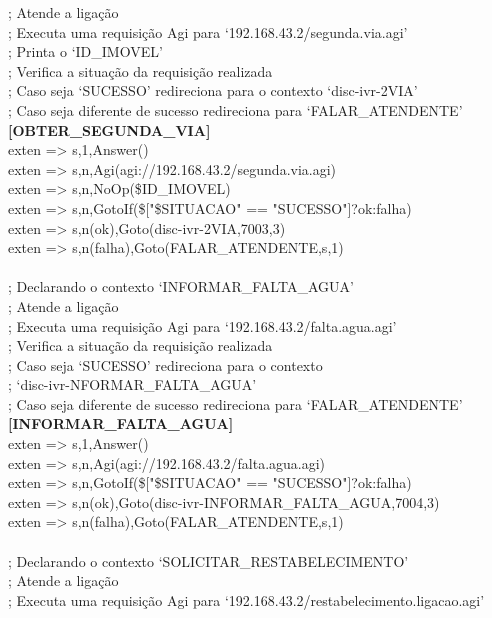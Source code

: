 \begin{apendicesenv}
; Atende a ligação \\
; Executa uma requisição Agi para ‘192.168.43.2/segunda.via.agi’ \\
; Printa o ‘ID\_IMOVEL’ \\
; Verifica a situação da requisição realizada \\
; Caso seja ‘SUCESSO’ redireciona para o contexto ‘disc-ivr-2VIA’ \\
; Caso seja diferente de sucesso redireciona para ‘FALAR\_ATENDENTE’ \\
\textbf{[OBTER\_SEGUNDA\_VIA]} \\
exten => s,1,Answer() \\
exten => s,n,Agi(agi://192.168.43.2/segunda.via.agi) \\
exten => s,n,NoOp(\${ID\_IMOVEL}) \\
exten => s,n,GotoIf(\$["\${SITUACAO}" == "SUCESSO"]?ok:falha) \\
exten => s,n(ok),Goto(disc-ivr-2VIA,7003,3) \\
exten => s,n(falha),Goto(FALAR\_ATENDENTE,s,1) \\
\\
; Declarando o contexto ‘INFORMAR\_FALTA\_AGUA’ \\
; Atende a ligação \\
; Executa uma requisição Agi para ‘192.168.43.2/falta.agua.agi’ \\
; Verifica a situação da requisição realizada \\
; Caso seja ‘SUCESSO’ redireciona para o contexto \\
; ‘disc-ivr-NFORMAR\_FALTA\_AGUA’ \\
; Caso seja diferente de sucesso redireciona para ‘FALAR\_ATENDENTE’ \\
\textbf{[INFORMAR\_FALTA\_AGUA]} \\
exten => s,1,Answer() \\
exten => s,n,Agi(agi://192.168.43.2/falta.agua.agi) \\
exten => s,n,GotoIf(\$["\${SITUACAO}" == "SUCESSO"]?ok:falha) \\
exten => s,n(ok),Goto(disc-ivr-INFORMAR\_FALTA\_AGUA,7004,3) \\
exten => s,n(falha),Goto(FALAR\_ATENDENTE,s,1) \\
 \\
; Declarando o contexto ‘SOLICITAR\_RESTABELECIMENTO’ \\
; Atende a ligação \\
; Executa uma requisição Agi para ‘192.168.43.2/restabelecimento.ligacao.agi’ \\

\end{apendicesenv}
